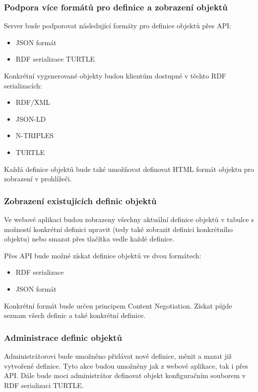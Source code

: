 \documentclass[thesis=B,czech]{FITthesis}[2012/06/26]
\begin{document}
 \subsubsection{Podpora více formátů pro definice a zobrazení objektů}
 Server bude podporovat následující formáty pro definice objektů přes API:
 \begin{itemize}
    \item JSON formát
    \item RDF serializace TURTLE \cite{turtle_example}
 \end{itemize}
 Konkrétní vygenerované objekty budou klientům dostupné v těchto RDF serializacích:
 \begin{itemize}
    \item RDF/XML \cite{rdf_xml}
    \item JSON-LD \cite{rdf_json_ld}
    \item N-TRIPLES \cite{rdf_n_triples}
    \item TURTLE 
 \end{itemize}
 Každá definice objektů bude také umožňovat definovat HTML formát objektu pro zobrazení v prohlížeči.
 
 \subsubsection{Zobrazení existujících definic objektů}
  Ve webové aplikaci budou zobrazeny všechny aktuální definice objektů v tabulce s možností konkrétní definici upravit (tedy také zobrazit definici konkrétního objektu)
  nebo smazat přes tlačítka vedle každé definice.
  
  Přes API bude možné získat definice objektů ve dvou formátech:
  \begin{itemize}
    \item RDF serializace
    \item JSON formát
 \end{itemize}
  Konkrétní formát bude určen principem Content Negotiation. Získat půjde seznam všech definic a také konkrétní definice.
 
 \subsubsection{Administrace definic objektů}
  Administrátorovi bude umožněno přidávat nové definice, měnit a mazat již vytvořené definice. Tyto akce budou umožněny jak z webové aplikace, tak i přes API.
  Dále bude moci administrátor definovat objekt konfiguračním souborem v RDF serializaci TURTLE.
  
\end{document}
